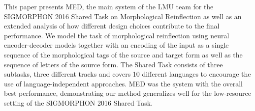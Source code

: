 This paper presents MED, the main system of the LMU team for the SIGMORPHON 2016 Shared Task on Morphological Reinflection as well as an extended analysis of how different design choices contribute to the final performance. We model the task of morphological reinflection using neural encoder-decoder models together with an encoding of the input as a single sequence of the morphological tags of the source and target form as well as the sequence of letters of the source form. The Shared Task consists of three subtasks, three different tracks and covers 10 different languages to encourage the use of language-independent approaches. MED was the system with the overall best performance, demonstrating our method generalizes well for the low-resource setting of the SIGMORPHON 2016 Shared Task.
